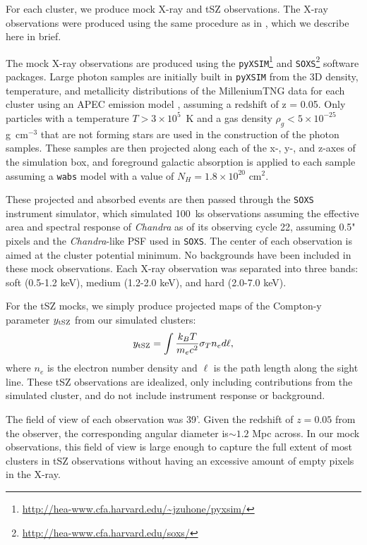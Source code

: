 For each cluster, we produce mock X-ray and tSZ observations. The X-ray observations were produced using the same procedure as in \cite{Ntampaka2019}, which we describe here in brief. 

The mock X-ray observations are produced using the \texttt{pyXSIM}\footnote{\url{http://hea-www.cfa.harvard.edu/~jzuhone/pyxsim/}} \cite{ZuHone2014} and \texttt{SOXS}\footnote{\url{http://hea-www.cfa.harvard.edu/soxs/}} software packages. Large photon samples are initially built in \texttt{pyXSIM} from the 3D density, temperature, and metallicity distributions of the MilleniumTNG data for each cluster using an APEC emission model \cite{Foster2012}, assuming a redshift of z = 0.05. Only particles with a temperature $T > 3 \times 10^5$~K and a gas density $\rho_g < 5 \times 10^{-25}$ g~cm$^{-3}$ that are not forming stars are used in the construction of the photon samples. These samples are then projected along each of the x-, y-, and z-axes of the simulation box, and foreground galactic absorption is applied to each sample assuming a \texttt{wabs} model \cite{wabs} with a value of $N_H = 1.8 \times 10^{20}$ cm$^2$.

These projected and absorbed events are then passed through the \texttt{SOXS} instrument simulator, which simulated 100~ks observations assuming the effective area and spectral response of {\it Chandra} as of its observing cycle 22, assuming 0.5" pixels and the {\it Chandra}-like PSF used in \texttt{SOXS}. The center of each observation is aimed at the cluster potential minimum. No backgrounds have been included in these mock observations. Each X-ray observation was separated into three bands: soft (0.5-1.2 keV), medium (1.2-2.0 keV), and hard (2.0-7.0 keV). 

For the tSZ mocks, we simply produce projected maps of the Compton-y parameter $y_{\rm tSZ}$ from our simulated clusters:
\begin{equation}
y_{\rm tSZ} = \int\frac{k_BT}{m_ec^2}\sigma_Tn_ed\ell,
\end{equation}
where $n_e$ is the electron number density and $\ell$ is the path length along the sight line. These tSZ observations are idealized, only including contributions from the simulated cluster, and do not include instrument response or background. 

The field of view of each observation was 39'. Given the redshift of $z=0.05$ from the observer, the corresponding angular diameter is$\sim1.2$ Mpc across. In our mock observations, this field of view is large enough to capture the full extent of most clusters in tSZ observations without having an excessive amount of empty pixels in the X-ray.

